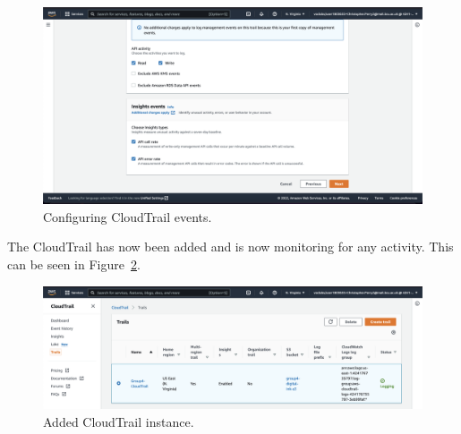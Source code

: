 \begin{figure}[!htbp]
    \centering
    \includegraphics[width=\textwidth]{resources/cloudtrail/cloudtrail-events-2}
    \caption{Configuring CloudTrail events.}
    \label{fig:cloudwatch-events-2}
\end{figure}

The CloudTrail has now been added and is now monitoring for any activity.
This can be seen in Figure~\ref{fig:cloudtrail-added}.

\begin{figure}[!htbp]
    \centering
    \includegraphics[width=\textwidth]{resources/cloudtrail/cloudtrail-added}
    \caption{Added CloudTrail instance.}
    \label{fig:cloudtrail-added}
\end{figure}



